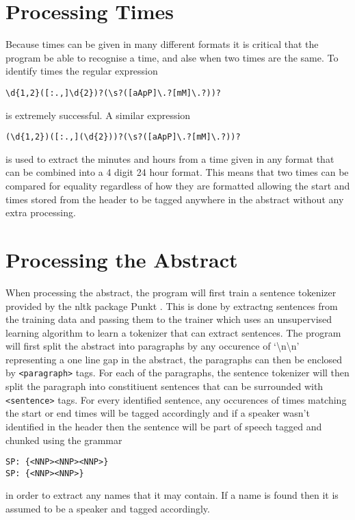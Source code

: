 \documentclass[draft]{article}
\begin{document}
\begin{multicols*}{2}
\section*{Processing Times}
Because times can be given in many different formats it is critical that the program be able to recognise a time, and alse when two times are the same. To identify times the regular expression 
\begin{verbatim}
\d{1,2}([:.,]\d{2})?(\s?([aApP]\.?[mM]\.?))?
\end{verbatim} is extremely successful. A similar expression
\begin{verbatim}
(\d{1,2})([:.,](\d{2}))?(\s?([aApP]\.?[mM]\.?))?
\end{verbatim} is used to extract the minutes and hours from a time given in any format that can be combined into a 4 digit 24 hour format. This means that two times can be compared for equality regardless of how they are formatted allowing the start and times stored from the header to be tagged anywhere in the abstract without any extra processing.

\section*{Processing the Abstract}
When processing the abstract, the program will first train a sentence tokenizer provided by the nltk package Punkt \citep{senttok}. This is done by extractng sentences from the training data and passing them to the trainer which uses an unsupervised learning algorithm \citep{compling} to learn a tokenizer that can extract sentences. The program will first split the abstract into paragraphs by any occurence of `\textbackslash n\textbackslash n' representing a one line gap in the abstract, the paragraphs can then be enclosed by \texttt{<paragraph>} tags. For each of the paragraphs, the sentence tokenizer will then split the paragraph into constitiuent sentences that can be surrounded with \texttt{<sentence>} tags. For every identified sentence, any occurences of times matching the start or end times will be tagged accordingly and if a speaker wasn't identified in the header then the sentence will be part of speech tagged and chunked using the grammar
\begin{verbatim}
SP: {<NNP><NNP><NNP>}
SP: {<NNP><NNP>}
\end{verbatim} 
in order to extract any names that it may contain. If a name 
is found then it is assumed to be a speaker and tagged accordingly.


\end{multicols*}
\end{document}
